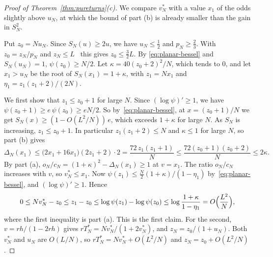 \begin{proof}[Proof of Theorem~\ref{thm:pureturns}(c)]
We compare $v^*_N$ with a value $x_1$ of the odds slightly above $u_N$, at which the bound of
part (b) is already smaller than the gain in $S_N^2$.

Put $z_0=Nu_N$. Since $S_N(u)\ge2u$, we have $u_N\le\frac12$ and $p_N\ge\frac23$. With
$z_0=z_N/p_N$ and $z_N\le L$~\cite[Proposition~3.8]{paperA} this gives $z_0\le\frac32L$. By
\eqref{eq:planar-bessel} and $S_N(u_N)=1$, $\psi(z_0)\ge N/2$. Let $\kappa=40(z_0+2)^2/N$, which
tends to $0$, and let $x_1>u_N$ be the root of $S_N(x_1)=1+\kappa$, with $z_1=Nx_1$ and
$\eta_1=z_1(z_1+2)/(2N)$.

We first show that $z_1\le z_0+1$ for large $N$. Since $(\log\psi)'\ge1$, we have
$\psi(z_0+1)\ge e\,\psi(z_0)\ge eN/2$. So by~\eqref{eq:planar-bessel}, at $x=(z_0+1)/N$ we get
$S_N(x)\ge(1-O(L^2/N))\,e$, which exceeds $1+\kappa$ for large $N$. As $S_N$ is increasing,
$z_1\le z_0+1$. In particular $z_1(z_1+2)\le N$ and $\kappa\le1$ for large $N$, so part (b) gives
\[
 \Delta_N(x_1)\le\bigl(2x_1+16x_1\bigr)(2z_1+2)\cdot2=\frac{72\,z_1(z_1+1)}N
 \le\frac{72(z_0+1)(z_0+2)}N\le2\kappa .
\]
By part (a), $o_N/c_N=(1+\kappa)^2-\Delta_N(x_1)\ge1$ at $v=x_1$. The ratio $o_N/c_N$ increases
with $v$, so $v^*_N\le x_1$. Now $\psi(z_1)\le\frac N2(1+\kappa)/(1-\eta_1)$
by~\eqref{eq:planar-bessel}, and $(\log\psi)'\ge1$. Hence
\[
 0\le Nv^*_N-z_0\le z_1-z_0\le\log\psi(z_1)-\log\psi(z_0)\le\log\frac{1+\kappa}{1-\eta_1}
 =O\Bigl(\frac{L^2}N\Bigr),
\]
where the first inequality is part (a). This is the first claim. For the second,
$v=rh/(1-2rh)$ gives $rT^*_N=Nv^*_N/(1+2v^*_N)$, and $z_N=z_0/(1+u_N)$. Both $v^*_N$ and $u_N$ are
$O(L/N)$, so $rT^*_N=Nv^*_N+O(L^2/N)$ and $z_N=z_0+O(L^2/N)$.
\end{proof}
